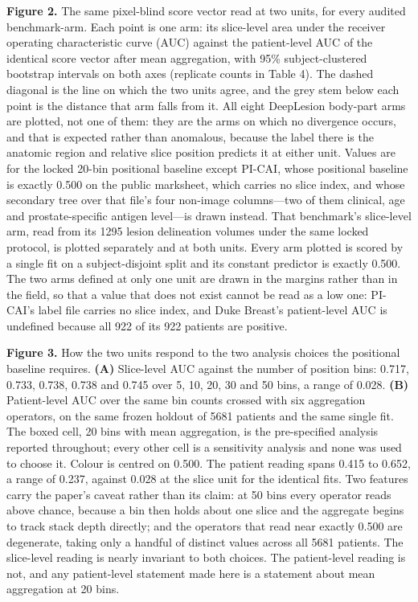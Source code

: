 \documentclass[11pt,letterpaper]{article}
\begin{document}
\textbf{Figure 2.} The same pixel-blind score vector read at two units, for every
audited benchmark-arm. Each point is one arm: its slice-level area under the
receiver operating characteristic curve (AUC) against the patient-level AUC of
the identical score vector after mean aggregation, with 95\% subject-clustered
bootstrap intervals on both axes (replicate counts in Table 4). The dashed
diagonal is the line on which the two units agree, and the grey stem below each
point is the distance that arm falls from it. All eight DeepLesion body-part arms
are plotted, not one of them: they are the arms on which no divergence occurs,
and that is expected rather than anomalous, because the label there is the
anatomic region and relative slice position predicts it at either unit. Values
are for the locked 20-bin positional baseline except PI-CAI, whose positional
baseline is exactly 0.500 on the public marksheet, which carries no slice index,
and whose secondary tree over that file's four non-image columns---two of them
clinical, age and prostate-specific antigen level---is drawn instead. That
benchmark's slice-level arm, read from its \num{1295} lesion delineation volumes
under the same locked protocol, is plotted separately and at both units. Every arm plotted is scored by a single fit on a
subject-disjoint split and its constant predictor is exactly 0.500. The two arms
defined at only one unit are drawn in the margins rather than in the field, so
that a value that does not exist cannot be read as a low one: PI-CAI's label file
carries no slice index, and Duke Breast's patient-level AUC is undefined because
all 922 of its 922 patients are positive.

\textbf{Figure 3.} How the two units respond to the two analysis choices the
positional baseline requires. \textbf{(A)} Slice-level AUC against the number of
position bins: 0.717, 0.733, 0.738, 0.738 and 0.745 over 5, 10, 20, 30 and 50
bins, a range of 0.028. \textbf{(B)} Patient-level AUC over the same bin counts
crossed with six aggregation operators, on the same frozen holdout of
\num{5681} patients and the same single fit. The boxed cell, 20 bins with mean
aggregation, is the pre-specified analysis reported throughout; every other cell
is a sensitivity analysis and none was used to choose it. Colour is centred on
0.500. The patient reading spans 0.415 to 0.652, a range of 0.237, against 0.028
at the slice unit for the identical fits. Two features carry the paper's caveat
rather than its claim: at 50 bins every operator reads above chance, because a
bin then holds about one slice and the aggregate begins to track stack depth
directly; and the operators that read near exactly 0.500 are degenerate, taking
only a handful of distinct values across all \num{5681} patients. The
slice-level reading is nearly invariant to both choices. The patient-level
reading is not, and any patient-level statement made here is a statement about
mean aggregation at 20 bins.
\end{document}
